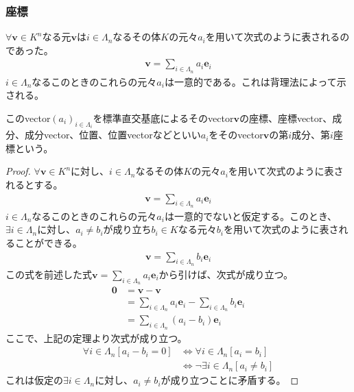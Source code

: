 \documentclass[dvipdfmx]{jsarticle}
\begin{document}
\subsubsection{座標}%
\begin{thm}\label{4.1.2.5}
$\forall\mathbf{v} \in K^{n}$なる元$\mathbf{v}$は$i \in \varLambda_{n}$なるその体$K$の元々$a_{i}$を用いて次式のように表されるのであった。
\begin{align*}
\mathbf{v} = \sum_{i \in \varLambda_{n}} {a_{i}\mathbf{e}_{i}}
\end{align*}
$i \in \varLambda_{n}$なるこのときのこれらの元々$a_{i}$は一意的である。これは背理法によって示される。
\end{thm}
\begin{dfn}
このvector$\left( a_{i} \right)_{i \in \varLambda_{i}}$を標準直交基底によるそのvector$\mathbf{v}$の座標、座標vector、成分、成分vector、位置、位置vectorなどといい$a_{i}$をそのvector$\mathbf{v}$の第$i$成分、第$i$座標という。
\end{dfn}
\begin{proof}
$\forall\mathbf{v} \in K^{n}$に対し、$i \in \varLambda_{n}$なるその体$K$の元々$a_{i}$を用いて次式のように表されるとする。
\begin{align*}
\mathbf{v} = \sum_{i \in \varLambda_{n}} {a_{i}\mathbf{e}_{i}}
\end{align*}
$i \in \varLambda_{n}$なるこのときのこれらの元々$a_{i}$は一意的でないと仮定する。このとき、$\exists i \in \varLambda_{n}$に対し、$a_{i} \neq b_{i}$が成り立ち$b_{i} \in K$なる元々$b_{i}$を用いて次式のように表されることができる。
\begin{align*}
\mathbf{v} = \sum_{i \in \varLambda_{n}} {b_{i}\mathbf{e}_{i}}
\end{align*}
この式を前述した式$\mathbf{v} = \sum_{i \in \varLambda_{n}} {a_{i}\mathbf{e}_{i}}$から引けば、次式が成り立つ。
\begin{align*}
\mathbf{0} &= \mathbf{v} - \mathbf{v}\\
&= \sum_{i \in \varLambda_{n}} {a_{i}\mathbf{e}_{i}} - \sum_{i \in \varLambda_{n}} {b_{i}\mathbf{e}_{i}}\\
&= \sum_{i \in \varLambda_{n}} {\left( a_{i} - b_{i} \right)\mathbf{e}_{i}}
\end{align*}
ここで、上記の定理より次式が成り立つ。
\begin{align*}
\forall i \in \varLambda_{n}\left[ a_{i} - b_{i} = 0 \right] &\Leftrightarrow \forall i \in \varLambda_{n}\left[ a_{i} = b_{i} \right]\\
&\Leftrightarrow \neg\exists i \in \varLambda_{n}\left[ a_{i} \neq b_{i} \right]
\end{align*}
これは仮定の$\exists i \in \varLambda_{n}$に対し、$a_{i} \neq b_{i}$が成り立つことに矛盾する。
\end{proof}
\end{document}
